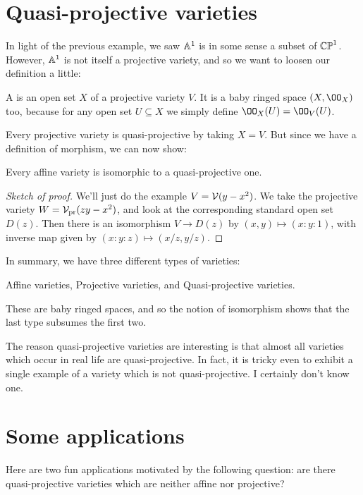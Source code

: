 \documentclass[11pt]{scrreprt}
\begin{document}
\section{Quasi-projective varieties}
In light of the previous example, we saw $\mathbb A^1$ is in some
sense a subset of $\mathbb{CP}^1$.
However, $\mathbb A^1$ is not itself a projective variety,
and so we want to loosen our definition a little:
\begin{definition}
	A  is
	an open set $X$ of a projective variety $V$.
	It is a baby ringed space $(X, \OO_X)$ too,
	because for any open set $U \subseteq X$
	we simply define $\OO_X(U) = \OO_V(U)$.
\end{definition}
Every projective variety is quasi-projective by taking $X = V$.
But since we have a definition of morphism, we can now show:
\begin{proposition}
	Every affine variety is isomorphic to a quasi-projective one.
\end{proposition}
\begin{proof}
	[Sketch of proof]
	We'll just do the example $V = \mathcal V(y-x^2)$.
	We take the projective variety $W = \mathcal V_{\text{pr}}(zy-x^2)$,
	and look at the corresponding standard open set $D(z)$.
	Then there is an isomorphism $V \to D(z)$ by $(x,y) \mapsto (x:y:1)$,
	with inverse map given by $(x:y:z) \mapsto (x/z, y/z)$.
\end{proof}

In summary, we have three different types of varieties:
\begin{itemize}
	\ii Affine varieties,
	\ii Projective varieties, and
	\ii Quasi-projective varieties.
\end{itemize}
These are baby ringed spaces, and so the notion of isomorphism
shows that the last type subsumes the first two.

The reason quasi-projective varieties are interesting is that
almost all varieties which occur in real life are quasi-projective.
In fact, it is tricky even to exhibit a single example
of a variety which is not quasi-projective.
I certainly don't know one.

\section{Some applications}
Here are two fun applications motivated by the following question:
are there quasi-projective varieties which are neither affine nor projective?
\end{document}
